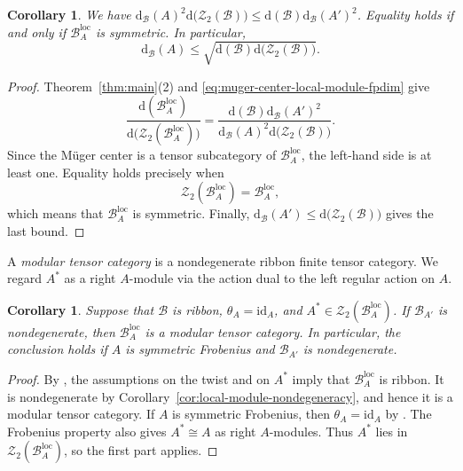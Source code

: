 \documentclass[10pt,a4paper]{amsart}
\numberwithin{equation}{section}
\newtheorem{corollary}[thmctr]{Corollary}
\newcommand{\B}{\mathcal{B}}
\newcommand{\Z}{\mathcal{Z}}
\newcommand{\loc}{\mathrm{loc}}
\newcommand{\FP}{\mathrm{d}}
\newcommand{\id}{\mathrm{id}}
\begin{document}
\begin{corollary}\label{cor:local-module-sharp-dimension-bound}
We have $\FP_{\B}(A)^2\FP\bigl(\Z_2(\B)\bigr) \leq \FP(\B)\FP_{\B}(A')^2$.
Equality holds if and only if $\B_A^{\loc}$ is symmetric.
In particular,
\[
  \FP_{\B}(A)
  \leq
  \sqrt{\FP(\B)\FP\bigl(\Z_2(\B)\bigr)}.
\]
\end{corollary}

\begin{proof}
Theorem~\ref{thm:main}(2) and
\eqref{eq:muger-center-local-module-fpdim} give
\[
  \frac{
    \FP(\B_A^{\loc})
  }{
    \FP\bigl(\Z_2(\B_A^{\loc})\bigr)
  }
  =
  \frac{
    \FP(\B)\FP_{\B}(A')^2
  }{
    \FP_{\B}(A)^2\FP\bigl(\Z_2(\B)\bigr)
  }.
\]
Since the M\"uger center is a tensor subcategory of $\B_A^{\loc}$, the
left-hand side is at least one. Equality holds precisely when
\[
  \Z_2(\B_A^{\loc})=\B_A^{\loc},
\]
which means that $\B_A^{\loc}$ is symmetric. Finally,
$\FP_{\B}(A')\leq\FP\bigl(\Z_2(\B)\bigr)$ gives the last bound.
\end{proof}

A \emph{modular tensor category} is a nondegenerate ribbon finite tensor
category. We regard $A^*$ as a right $A$-module via the action dual to the
left regular action on $A$.
\begin{corollary}\label{cor:local-module-modularity}
Suppose that $\B$ is ribbon, $\theta_A=\id_A$, and
$A^*\in\Z_2(\B_A^{\loc})$. If $\B_{A'}$ is nondegenerate, then
$\B_A^{\loc}$ is a modular tensor category. 
In particular, the conclusion holds if $A$ is symmetric Frobenius and
$\B_{A'}$ is nondegenerate.
\end{corollary}
\begin{proof}
By \cite[Theorem~5.21(b)]{shimizu2026commutative}, the assumptions on the
twist and on $A^*$ imply that $\B_A^{\loc}$ is ribbon. It is nondegenerate by
Corollary~\ref{cor:local-module-nondegeneracy}, and hence it is a modular
tensor category. If $A$ is symmetric Frobenius, then $\theta_A=\id_A$ by
\cite[Lemma~2.6]{shimizu2026commutative}. The Frobenius property also gives
$A^*\cong A$ as right $A$-modules. Thus $A^*$ lies in
$\Z_2(\B_A^\loc)$, so the first part applies.
\end{proof}




\end{document}
